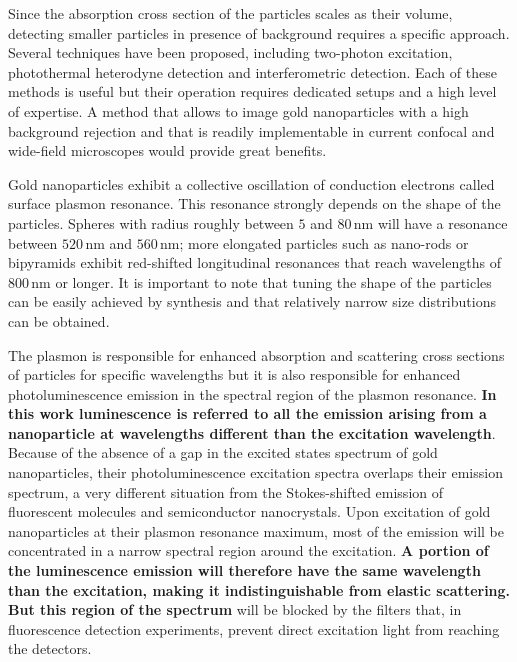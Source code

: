 \documentclass[journal=nalefd,manuscript=letter]{achemso}
\newcommand{\nm}{\ensuremath{\,\textrm{nm}}}
\begin{document}
Since the absorption cross section of the particles scales as their volume,
detecting smaller particles in presence of background requires a specific
approach. Several techniques have been proposed, including two-photon
excitation\cite{VandenBroek2013}, photothermal \mbox{heterodyne}
detection\cite{Berciaud2006} and interferometric detection\cite{Ignatovich2006}.
Each of these methods is useful but their operation requires dedicated setups
and a high level of expertise. A method that allows to image gold nanoparticles
with a high background rejection and that is readily implementable in current
confocal and wide-field microscopes would provide great benefits.

Gold nanoparticles exhibit a collective oscillation of conduction electrons
called surface plasmon resonance\cite{Bouhelier2005}. This resonance strongly
depends on the shape of the particles\cite{Dulkeith2004,Link2000a}.
Spheres with radius roughly between $5$ and $80\nm$ will have a resonance
between $520\nm$ and $560\nm$; more elongated particles such as nano-rods or
bipyramids\cite{Rao2015} exhibit red-shifted longitudinal resonances that reach
wavelengths of $800\nm$ or longer\cite{Ngoc2015}. It is important to note that
tuning the shape of the particles can be easily achieved by synthesis and that
relatively narrow size distributions can be obtained\cite{Nikoobakht2003}.

The plasmon is responsible for enhanced absorption and scattering cross
sections\cite{Ni2008} of particles for specific wavelengths but it is also
responsible for enhanced photoluminescence emission in the spectral region of
the plasmon resonance. \textbf{In this work luminescence is referred to all the
emission arising from a nanoparticle at wavelengths different than the
excitation wavelength}. Because of the absence of a gap in the excited states
spectrum of gold nanoparticles, their photoluminescence excitation spectra
overlaps their emission spectrum\cite{Yorulmaz2012}, a very different situation
from the Stokes-shifted emission of fluorescent molecules and semiconductor
nanocrystals. Upon excitation of gold nanoparticles at their plasmon resonance
maximum, most of the emission will be concentrated in a narrow spectral region
around the excitation. \textbf{A portion of the luminescence emission will
therefore have the same wavelength than the excitation, making it
indistinguishable from elastic scattering. But this region of the spectrum} will
be blocked by the filters that, in fluorescence detection experiments, prevent
direct excitation light from reaching the detectors.
\end{document}
